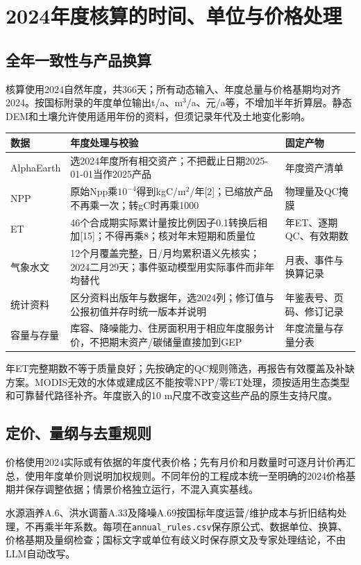 \documentclass[12pt,a4paper,fontset=fandol]{ctexart}
\newcommand{\file}[1]{\nolinkurl{#1}}
\begin{document}
\section{2024年度核算的时间、单位与价格处理}
\subsection{全年一致性与产品换算}
核算使用2024自然年度，共366天；所有动态输入、年度总量与价格基期均对齐2024。按国标附录的年度单位输出t/a、m$^3$/a、元/a等，不增加半年折算层。静态DEM和土壤允许使用适用年份的资料，但须记录年代及土地变化影响。
\begin{longtable}{P{2.7cm}P{7.7cm}P{2.8cm}}
\toprule 数据 & 年度处理与校验 & 固定产物 \\\midrule\endhead
AlphaEarth & 选2024年度所有相交资产；不把截止日期2025-01-01当作2025产品 & 年度资产清单 \\
NPP & 原始Npp乘$10^{-4}$得到kgC/m$^2$/年[2]；已缩放产品不再乘一次；转gC时再乘1000 & 物理量及QC掩膜 \\
ET & 46个合成期实际累计量按比例因子0.1转换后相加[15]；不得再乘8；核对年末短期和质量位 & 年ET、逐期QC、有效期数 \\
气象水文 & 12个月覆盖完整，日/月均累积语义先核实；2024二月29天；事件驱动模型用实际事件而非年均替代 & 月表、事件与换算记录 \\
统计资料 & 区分资料出版年与数据年，选2024列；修订值与公报初值并存时统一版本并说明 & 年鉴表号、页码、修订记录 \\
容量与存量 & 库容、降噪能力、住房面积用于相应年度服务计价，不把期末资产/碳储量直接加到GEP & 年度流量与存量分表 \\
\bottomrule
\end{longtable}
年ET完整期数不等于质量良好；先按确定的QC规则筛选，再报告有效覆盖及补缺方案。MODIS无效的水体或建成区不能按零NPP/零ET处理，须按适用生态类型和可靠替代路径补齐。年度嵌入的10 m尺度不改变这些产品的原生支持尺度。

\subsection{定价、量纲与去重规则}
价格使用2024实际或有依据的年度代表价格；先有月价和月数量时可逐月计价再汇总，使用年度单价则说明加权规则。不同年份的工程成本统一至明确的2024价格基期并保存调整依据；情景价格独立运行，不混入真实基线。

水源涵养A.6、洪水调蓄A.33及降噪A.69按国标年度运营/维护成本与折旧结构处理，不再乘半年系数。每项在\file{annual_rules.csv}保存原公式、数据单位、换算、价格基期及量纲检查；国标文字或单位有歧义时保存原文及专家处理结论，不由LLM自动改写。
\end{document}
